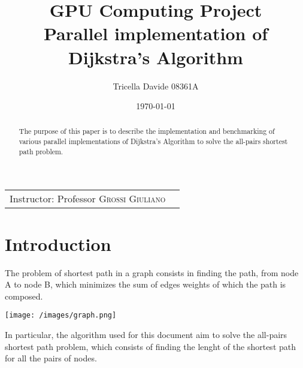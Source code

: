 \documentclass[
	a4paper, %
	12pt, %
]{class}
\title{GPU Computing Project\\Parallel implementation of Dijkstra's Algorithm} %
\author{Tricella Davide 08361A} %
\date{\today} %
\begin{document}
\maketitle %

\begin{center}
    \begin{tabular}{l r}
        Instructor: Professor \textsc{Grossi Giuliano}
    \end{tabular}
\end{center}


\begin{abstract}
    The purpose of this paper is to describe the implementation and benchmarking of various parallel implementations of Dijkstra's Algorithm to solve the all-pairs shortest path problem.
\end{abstract}


\tableofcontents
\newpage

\section{Introduction}

The problem of shortest path in a graph consists in finding the path, from node A to node B,
which minimizes the sum of edges weights of which the path is composed.\\

\begin{center}
    \texttt{[image: /images/graph.png]}
\end{center}

In particular, the algorithm used for this document aim to solve the all-pairs shortest path problem,
which consists of finding the lenght of the shortest path for all the pairs of nodes.\\
\end{document}
